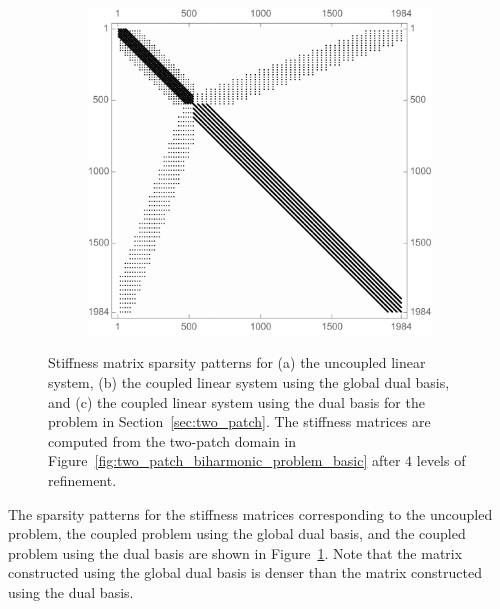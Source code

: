 \begin{figure}[ht]
\begin{subfigure}[b]{0.45\textwidth}
		\caption{}
	\end{subfigure}
	\begin{subfigure}[b]{0.45\textwidth}
		\includegraphics[width=\textwidth]{dual_sp}
		\caption{}
	\end{subfigure}
	\caption{Stiffness matrix sparsity patterns for (a) the uncoupled linear system, (b) the coupled linear system using the global dual basis, and (c) the coupled linear system using the \Bezier dual basis for the problem in Section~\ref{sec:two_patch}. The stiffness matrices are computed from the two-patch domain in Figure~\ref{fig:two_patch_biharmonic_problem_basic} after $4$ levels of refinement.}\label{fig:sparsity_pattern}
\end{figure}

The sparsity patterns for the stiffness matrices corresponding to the uncoupled problem, the coupled problem using the global dual basis, and the coupled problem using the \Bezier dual basis are shown in Figure~\ref{fig:sparsity_pattern}. Note that the matrix constructed using the global dual basis is denser than the matrix constructed using the \Bezier dual basis.\par

